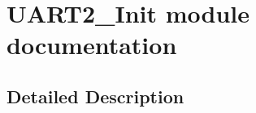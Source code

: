 \hypertarget{group___u_a_r_t2___init__module}{}\section{U\+A\+R\+T2\+\_\+\+Init module documentation}
\label{group___u_a_r_t2___init__module}


\subsection{Detailed Description}
